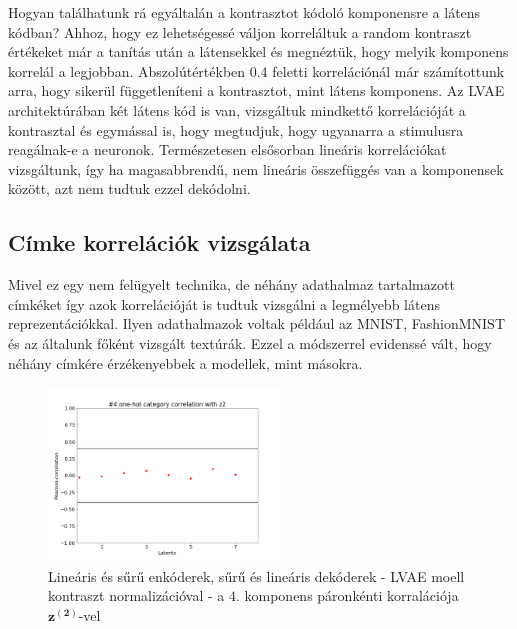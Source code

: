 \documentclass[12pt, english]{article}
\begin{document}
\vspace{4mm}

\par Hogyan találhatunk rá egyáltalán a kontrasztot kódoló komponensre a látens kódban? Ahhoz, hogy ez lehetségessé váljon korreláltuk a random kontraszt értékeket már a tanítás után a látensekkel és megnéztük, hogy melyik komponens korrelál a legjobban. Abszolútértékben 0.4 feletti korrelációnál már számítottunk arra, hogy sikerül függetleníteni a kontrasztot, mint látens komponens. Az LVAE architektúrában két látens kód is van, vizsgáltuk mindkettő korrelációját a kontrasztal és egymással is, hogy megtudjuk, hogy ugyanarra a stimulusra reagálnak-e a neuronok. Természetesen elsősorban lineáris korrelációkat vizsgáltunk, így ha magasabbrendű, nem lineáris összefüggés van a komponensek között, azt nem tudtuk ezzel dekódolni.

\vspace{4mm}

\subsection{Címke korrelációk vizsgálata}

\vspace{4mm}

\par Mivel ez egy nem felügyelt technika, de néhány adathalmaz tartalmazott címkéket így azok korrelációját is tudtuk vizsgálni a legmélyebb látens reprezentációkkal. Ilyen adathalmazok voltak például az MNIST, FashionMNIST és az általunk főként vizsgált textúrák. Ezzel a módszerrel evidenssé vált, hogy néhány címkére érzékenyebbek a modellek, mint másokra.

\vspace{4mm}

\begin{figure}[H]
    \centering
    \includegraphics[width=0.55\textwidth]{17_DenseLinLinLadderVAE_contrastNorm-cat-4-to-z2-corr.png}
    \caption{Lineáris és sűrű enkóderek, sűrű és lineáris dekóderek - LVAE moell kontraszt normalizációval - a $4.$ komponens páronkénti korralációja $\bm{z^{(2)}}$-vel}
\end{figure}
\end{document}
